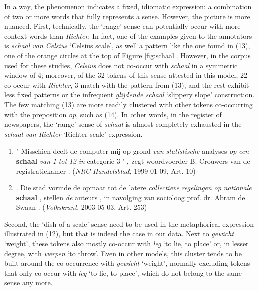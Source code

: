 \documentclass[
]{book}
\begin{document}
In a way, the phenomenon indicates a fixed, idiomatic expression: a combination of two or more words that fully represents a sense. However, the picture is more nuanced.
First, technically, the `range' sense can potentially occur with more context words than \emph{Richter}. In fact, one of the examples given to the annotators is \emph{schaal van Celsius} `Celsius scale', as well a pattern like the one found in (13), one of the orange circles at the top of Figure \ref{fig:schaal}. However, in the corpus used for these studies, \emph{Celsius} does not co-occur with \emph{schaal} in a symmetric window of 4; moreover, of the 32 tokens of this sense attested in this model, 22 co-occur with \emph{Richter}, 3 match with the pattern from (13), and the rest exhibit less fixed patterns or the infrequent \emph{glijdende schaal} `slippery slope' construction. The few matching (13) are more readily clustered with other tokens co-occurring with the preposition \emph{op}, such as (14). In other words, in the register of newspapers, the `range' sense of \emph{schaal} is almost completely exhausted in the \emph{schaal van Richter} `Richter scale' expression.

\begin{enumerate}
\def\labelenumi{(\arabic{enumi})}
\setcounter{enumi}{12}
\item
  " Misschien deelt de computer mij op grond \emph{van} \emph{statistische} analyses \emph{op} \emph{een} \textbf{schaal} \emph{van} \emph{1} \emph{tot} \emph{12} \emph{in} categorie 3 ' , zegt woordvoerder B. Crouwers van de registratiekamer . (\emph{NRC Handelsblad}, 1999-01-09, Art. 10)
\item
  . Die stad vormde de opmaat tot de latere \emph{collectieve} \emph{regelingen} \emph{op} \emph{nationale} \textbf{schaal} , stellen \emph{de} auteurs , in navolging van socioloog prof. dr. Abram de Swaan . (\emph{Volkskrant}, 2003-05-03, Art. 253)
\end{enumerate}

Second, the `dish of a scale' sense need to be used in the metaphorical expression illustrated in (12), but that is indeed the case in our data. Next to \emph{gewicht} `weight', these tokens also mostly co-occur with \emph{leg} `to lie, to place' or, in lesser degree, with \emph{werpen} `to throw'. Even in other models, this cluster tends to be built around the co-occurrence with \emph{gewicht} `weight', normally excluding tokens that only co-occur with \emph{leg} `to lie, to place', which do not belong to the same sense any more.
\end{document}
